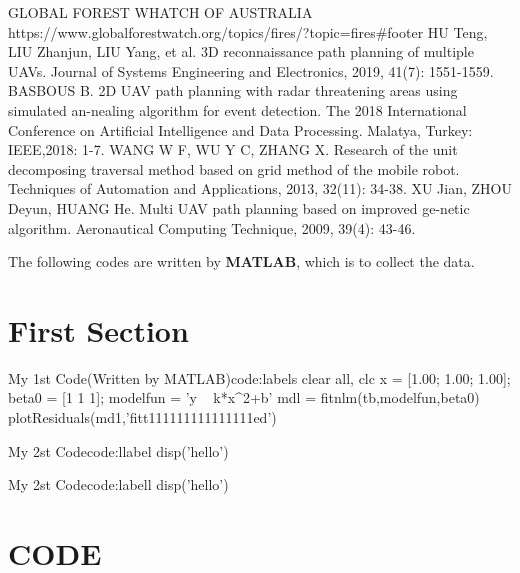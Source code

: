 \clearpage   %
\begin{thebibliography}{99}
     GLOBAL FOREST WHATCH OF AUSTRALIA \\https://www.globalforestwatch.org/topics/fires/?topic=fires\#footer
	 HU Teng, LIU Zhanjun, LIU Yang, et al. 3D reconnaissance path planning of multiple UAVs. Journal of Systems Engineering and Electronics, 2019, 41(7): 1551-1559.
	 BASBOUS B. 2D UAV path planning with radar threatening areas using simulated an-nealing algorithm for event detection. The 2018 International Conference on Artificial Intelligence and Data Processing. Malatya, Turkey: IEEE,2018: 1-7.
	 WANG W F, WU Y C, ZHANG X. Research of the unit decomposing traversal method based on grid method of the mobile robot. Techniques of Automation and Applications, 2013, 32(11): 34-38.
	 XU Jian, ZHOU Deyun, HUANG He. Multi UAV path planning based on improved ge-netic algorithm. Aeronautical Computing Technique, 2009, 39(4): 43-46.
\end{thebibliography}
\begin{center}
    The following codes are written by \textbf{MATLAB}, which is to collect the data.
\appendix
\end{center}
\appendix
\section{First Section}
\begin{matlab}{My 1st Code(Written by MATLAB)}{code:labels}
clear all, clc
x = [1.00; 1.00; 1.00];
beta0 = [1 1 1];
modelfun = 'y ~ k*x^2+b'
mdl = fitnlm(tb,modelfun,beta0)
plotResiduals(md1,'fitt111111111111111ed')




\end{matlab}
\begin{matlab}{My 2st Code}{code:llabel}
disp('hello')
\end{matlab}
\begin{matlab}{My 2st Code}{code:labell}
    disp('hello')
\end{matlab}
\section{CODE}

